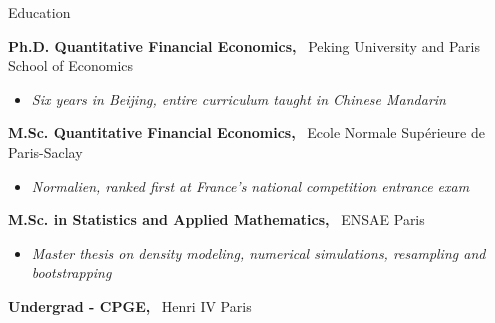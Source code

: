 \documentclass[usegeometry, 10pt, a4paper]{cv} %
\newcommand{\activite}[1]{\textbf{#1}\ }
\begin{document}
\begin{rubriquetableau}[0.95\textwidth]{Education}\\
\vspace{-0.5cm}

\activite{Ph.D. Quantitative Financial Economics,} Peking University and Paris School of Economics\\
\vspace{-0.8cm}  
\begin{itemize}[label={},
  rightmargin=\dimexpr\linewidth-13cm-\leftmargin\relax]
\item \small{\emph{Six years in Beijing, entire curriculum taught in Chinese Mandarin}}
\end{itemize}

\vspace{0.2cm}

\activite{M.Sc. Quantitative Financial Economics,} Ecole Normale Supérieure
de Paris-Saclay \\
\vspace{-0.3cm}
\begin{itemize}[label={}, rightmargin=\dimexpr\linewidth-13cm-\leftmargin\relax]
\item \small{\emph{Normalien, ranked first at France's national competition entrance exam}}
\end{itemize}

\vspace{0.2cm}


\activite{M.Sc. in Statistics and Applied Mathematics,} ENSAE Paris\\
\vspace{-0.3cm}
\begin{itemize}[label={}, rightmargin=\dimexpr\linewidth-13cm-\leftmargin\relax]
\item \small{\emph{Master thesis on density modeling, numerical simulations, resampling and bootstrapping}}
\end{itemize}

\activite{Undergrad - CPGE,} Henri IV Paris
\end{rubriquetableau}
\end{document}
